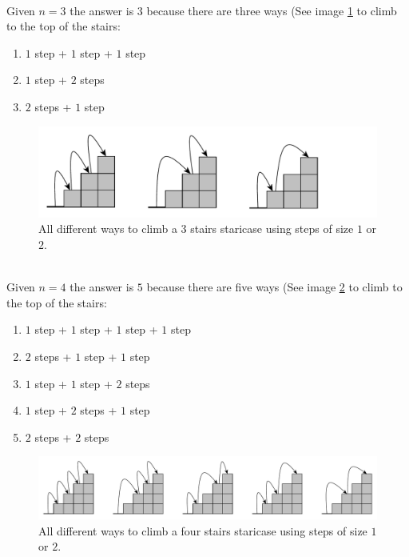 \begin{example}
	\hfill \\ 
	Given $n = 3$ the answer is $3$ because there are three ways (See image \ref{fig:stair_example_3} to climb to the top of the stairs:
	\begin{enumerate}
		\item $1$ step + $1$ step + $1$ step
		\item $1$ step + $2$ steps
		\item $2$ steps + $1$ step
	\end{enumerate}

\begin{figure}
	\label{fig:stair_example_3}
	\centering
	\includegraphics[width=\textwidth]{sources/stairs_climbing/images/stairs3}
	\caption{All different ways to climb a 3 stairs staricase using steps of size $1$ or $2$.}
\end{figure}

\end{example}

\begin{example}
	\hfill \\
	Given $n = 4$ the answer is $5$ because there are five ways (See image \ref{fig:stair_example_5} to climb to the top of the stairs:
	\begin{enumerate}
		\item $1$ step + $1$ step + $1$ step + $1$ step
		\item $2$ steps + $1$ step + $1$ step
		\item $1$ step + $1$ step + $2$ steps 
		\item $1$ step + $2$ steps + $1$ step
		\item $2$ steps +  $2$ steps
	\end{enumerate}

\begin{figure}
	\label{fig:stair_example_5}
	\centering
	\includegraphics[width=\textwidth]{sources/stairs_climbing/images/stairs4}
	\caption{All different ways to climb a four stairs staricase using steps of size $1$ or $2$.}
\end{figure}

\end{example}
	

